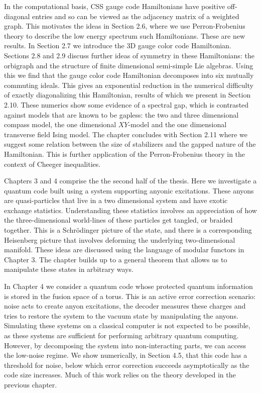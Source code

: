 \documentclass[11pt,oneside]{report}
\begin{document}
In the computational basis, 
CSS gauge code Hamiltonians have positive off-diagonal
entries and so can be viewed as the adjacency matrix
of a weighted graph.
This motivates the ideas in Section 2.6, where 
we use Perron-Frobenius theory to
describe the low energy spectrum such Hamiltonians.
These are new results.
In Section 2.7 we introduce the 3D gauge color code Hamiltonian.
Sections 2.8 and 2.9 discuss further ideas of
symmetry in these Hamiltonians: the orbigraph and
the structure of finite dimensional semi-simple Lie algebras.
Using this we find that the gauge color code Hamiltonian
decomposes into six mutually commuting ideals.
This gives an exponential reduction in the numerical
difficulty of exactly diagonalizing this Hamiltonian,
results of which we present in Section 2.10.
These numerics show some evidence of a spectral
gap, which is contrasted against models that are known
to be gapless: the two and three dimensional compass model,
the one dimensional $XY$-model and the one dimensional
transverse field Ising model.
The chapter concludes with Section 2.11 where
we suggest some relation between the size of
stabilizers and the gapped nature of the Hamiltonian.
This is further application of the Perron-Frobenius 
theory in the context of Cheeger inequalities.

Chapters 3 and 4 comprise the the second half of the thesis.
Here we investigate a quantum 
code built using a system supporting anyonic excitations.
These anyons are quasi-particles that live in a two
dimensional system and have exotic exchange statistics. 
Understanding these statistics involves an appreciation of
how the three-dimensional world-lines of these particles
get tangled, or braided together. This is 
a Schr\"{o}dinger picture of the state, and there is a corresponding
Heisenberg picture that involves deforming the underlying
two-dimensional manifold.
These ideas are discussed using the language of modular functors
in Chapter 3.
The chapter builds up to 
a general theorem that allows us to manipulate these
states in arbitrary ways.

In Chapter 4 we consider a quantum code whose protected
quantum information is stored in the fusion space of a torus.
This is an active error correction scenario: 
noise acts to create anyon excitations, the
decoder measures these charges and tries to restore
the system to the vacuum state by manipulating the anyons.
Simulating these systems on a classical computer is not
expected to be possible, as these systems are sufficient for
performing arbitrary quantum computing.
However, by decomposing the system into non-interacting parts,
we can access the low-noise regime.
We show numerically, in Section 4.5,
that this code has a threshold for noise, 
below which error correction succeeds asymptotically
as the code size increases.
Much of this work relies on the theory developed in the
previous chapter.
\end{document}
